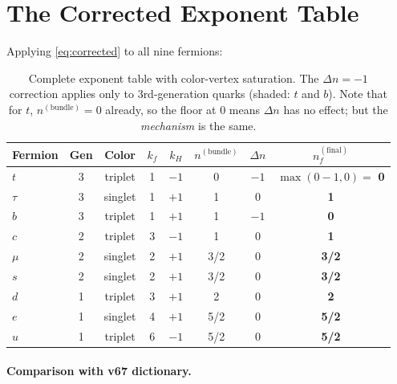 \documentclass[11pt,a4paper]{article}
\theoremstyle{definition}
\theoremstyle{remark}
\begin{document}
\section{The Corrected Exponent Table}
\label{sec:corrected-table}

Applying \eqref{eq:corrected} to all nine fermions:

\begin{table}[h]
\centering
\begin{tabular}{lccccccc}
\toprule
Fermion & Gen & Color & $k_f$ & $k_H$ & $n^{(\text{bundle})}$ &
  $\Delta n$ & $n_f^{(\text{final})}$ \\
\midrule
$t$ & 3 & triplet & 1 & $-1$ & 0 & $-1$ & $\max(0-1,0) = $ \textbf{0} \\
$\tau$ & 3 & singlet & 1 & $+1$ & 1 & 0 & \textbf{1} \\
$b$ & 3 & triplet & 1 & $+1$ & 1 & $-1$ & \textbf{0} \\
$c$ & 2 & triplet & 3 & $-1$ & 1 & 0 & \textbf{1} \\
$\mu$ & 2 & singlet & 2 & $+1$ & 3/2 & 0 & \textbf{3/2} \\
$s$ & 2 & singlet & 2 & $+1$ & 3/2 & 0 & \textbf{3/2} \\
$d$ & 1 & triplet & 3 & $+1$ & 2 & 0 & \textbf{2} \\
$e$ & 1 & singlet & 4 & $+1$ & 5/2 & 0 & \textbf{5/2} \\
$u$ & 1 & triplet & 6 & $-1$ & 5/2 & 0 & \textbf{5/2} \\
\bottomrule
\end{tabular}
\caption{Complete exponent table with color-vertex saturation.
The $\Delta n = -1$ correction applies only to 3rd-generation quarks
(shaded: $t$ and $b$).  Note that for $t$, $n^{(\text{bundle})} = 0$
already, so the floor at 0 means $\Delta n$ has no effect; but the
\emph{mechanism} is the same.}
\label{tab:corrected}
\end{table}

\paragraph{Comparison with v67 dictionary.}
\end{document}
